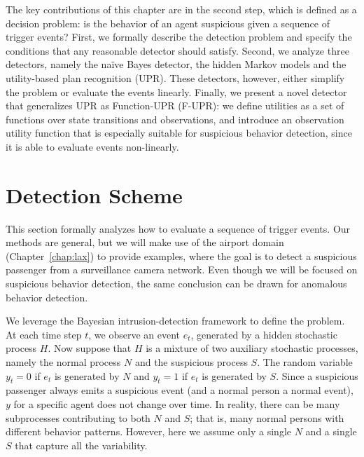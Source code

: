 The key contributions of this chapter are in the second step, which is defined as a decision problem: {is the behavior of an agent suspicious given a sequence of trigger events?} First, we formally describe the detection problem and specify the conditions that any reasonable detector should satisfy. Second, we analyze three detectors, namely the na{\"i}ve Bayes detector, the hidden Markov models and the utility-based plan recognition (UPR). These detectors, however, either simplify the problem or evaluate the events linearly. Finally, we present a novel detector that generalizes UPR as Function-UPR (F-UPR): we define utilities as a set of functions over state transitions and observations, and introduce an observation utility function that is especially suitable for suspicious behavior detection, since it is able to evaluate events non-linearly.
%





\section{Detection Scheme}

This section formally analyzes how to evaluate a sequence of trigger events. 
Our methods are general, but we will make use of the airport domain (Chapter~\ref{chap:lax}) to provide examples, where the goal is to detect a suspicious passenger from a surveillance camera network. Even though we will be focused on suspicious behavior detection, the same conclusion can be drawn for anomalous behavior detection. 

We leverage the Bayesian intrusion-detection framework \citep{Helman1993} to define the problem. At each time step $t$, we observe an event $e_t$, generated by a hidden stochastic process $H$. Now suppose that $H$ is a mixture of two auxiliary stochastic processes, namely the normal process $N$ and the suspicious process $S$. The random variable $y_t=0$ if $e_t$ is generated by $N$ and $y_t=1$ if $e_t$ is generated by $S$. Since a suspicious passenger always emits a suspicious event (and a normal person a normal event), $y$ for a specific agent does not change over time. In reality, there can be many subprocesses contributing to both $N$ and $S$; that is, many normal persons with different behavior patterns. However, here we assume only a single $N$ and a single $S$ that capture all the variability. 

